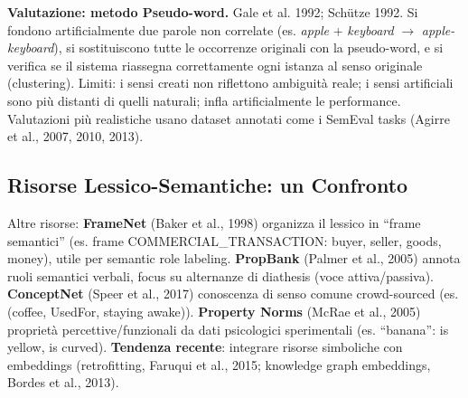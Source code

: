 \documentclass[12pt,a4paper]{article}
\begin{document}
\begin{defbox}
\textbf{Valutazione: metodo Pseudo-word.}
Gale et al. 1992; Sch\"utze 1992. Si fondono artificialmente due parole non correlate (es. \textit{apple} + \textit{keyboard} $\to$ \textit{apple-keyboard}), si sostituiscono tutte le occorrenze originali con la pseudo-word, e si verifica se il sistema riassegna correttamente ogni istanza al senso originale (clustering). Limiti: i sensi creati non riflettono ambiguit\`a reale; i sensi artificiali sono pi\`u distanti di quelli naturali; infla artificialmente le performance. Valutazioni pi\`u realistiche usano dataset annotati come i SemEval tasks (Agirre et al., 2007, 2010, 2013).
\end{defbox}

\subsection{Risorse Lessico-Semantiche: un Confronto}

\begin{resultbox}
\begin{center}
\end{center}
\end{resultbox}

Altre risorse: \textbf{FrameNet} (Baker et al., 1998) organizza il lessico in ``frame semantici'' (es. frame COMMERCIAL\_TRANSACTION: buyer, seller, goods, money), utile per semantic role labeling. \textbf{PropBank} (Palmer et al., 2005) annota ruoli semantici verbali, focus su alternanze di diathesis (voce attiva/passiva). \textbf{ConceptNet} (Speer et al., 2017) conoscenza di senso comune crowd-sourced (es. (coffee, UsedFor, staying awake)). \textbf{Property Norms} (McRae et al., 2005) proprietà percettive/funzionali da dati psicologici sperimentali (es. ``banana'': is yellow, is curved). \textbf{Tendenza recente}: integrare risorse simboliche con embeddings (retrofitting, Faruqui et al., 2015; knowledge graph embeddings, Bordes et al., 2013).
\end{document}
